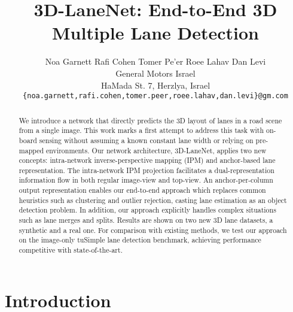 \documentclass[10pt,twocolumn,letterpaper]{article}
\begin{document}
\title{3D-LaneNet: End-to-End 3D Multiple Lane Detection}

\author{Noa Garnett \hspace{1cm} Rafi Cohen \hspace{1cm} Tomer Pe'er \hspace{1cm} Roee Lahav\hspace{1cm}  Dan Levi\\
	General Motors Israel\\
	HaMada St. 7, Herzlya, Israel\\
	{\tt\small \{noa.garnett,rafi.cohen,tomer.peer,roee.lahav,dan.levi\}@gm.com}
}

\maketitle
\ificcvfinal\thispagestyle{empty}\fi

\begin{abstract}
	We introduce a network that directly predicts the 3D layout of lanes in a road scene from a single image. This work marks a first attempt to address this task with on-board sensing without assuming a known constant lane width or relying on pre-mapped environments. Our network architecture, 3D-LaneNet, applies two new concepts: intra-network inverse-perspective mapping (IPM) and anchor-based lane representation. The intra-network IPM projection facilitates a dual-representation information flow in both regular image-view and top-view. An anchor-per-column output representation enables our end-to-end approach which replaces common heuristics such as clustering and outlier rejection, casting lane estimation as an object detection problem. In addition, our approach explicitly handles complex situations such as lane merges and splits. Results are shown on two new 3D lane datasets, a synthetic and a real one. For comparison with existing methods, we test our approach on the image-only tuSimple lane detection benchmark, achieving performance competitive with state-of-the-art.
\end{abstract}

\vspace{-0.7cm}

\section{Introduction}
\end{document}
